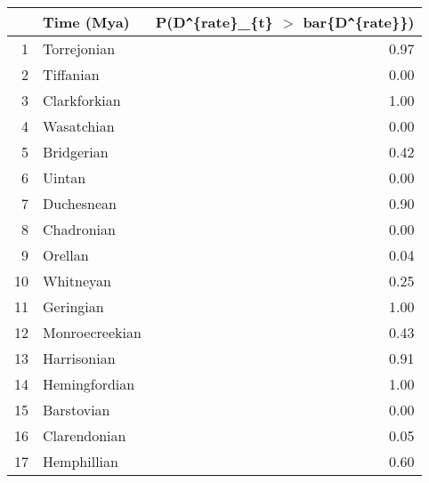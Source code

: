 \begin{table}[ht]
\centering
\begin{tabular}{rlr}
  \hline
 & Time (Mya) & P(D\verb|^|\{rate\}\_\{t\} $>$ bar\{D\verb|^|\{rate\}\}) \\ 
  \hline
1 & Torrejonian & 0.97 \\ 
  2 & Tiffanian & 0.00 \\ 
  3 & Clarkforkian & 1.00 \\ 
  4 & Wasatchian & 0.00 \\ 
  5 & Bridgerian & 0.42 \\ 
  6 & Uintan & 0.00 \\ 
  7 & Duchesnean & 0.90 \\ 
  8 & Chadronian & 0.00 \\ 
  9 & Orellan & 0.04 \\ 
  10 & Whitneyan & 0.25 \\ 
  11 & Geringian & 1.00 \\ 
  12 & Monroecreekian & 0.43 \\ 
  13 & Harrisonian & 0.91 \\ 
  14 & Hemingfordian & 1.00 \\ 
  15 & Barstovian & 0.00 \\ 
  16 & Clarendonian & 0.05 \\ 
  17 & Hemphillian & 0.60 \\ 
   \hline
\end{tabular}
\label{tab:rate_peak}
\end{table}
